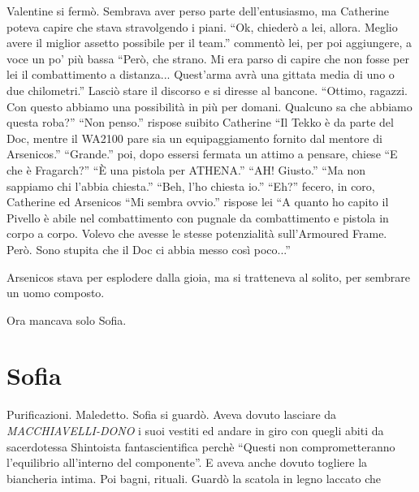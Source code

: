     Valentine si fermò. Sembrava aver perso parte dell'entusiasmo, ma Catherine poteva capire che stava stravolgendo i
    piani. ``Ok, chiederò a lei, allora. Meglio avere il miglior assetto possibile per il team.'' commentò lei, per poi
    aggiungere, a voce un po' più bassa ``Però, che strano. Mi era parso di capire che non fosse per lei il
    combattimento a distanza... Quest'arma avrà una gittata media di uno o due chilometri.'' Lasciò stare il discorso e
    si diresse al bancone. ``Ottimo, ragazzi. Con questo abbiamo una possibilità in più per domani. Qualcuno sa che
    abbiamo questa roba?'' ``Non penso.'' rispose suibito Catherine ``Il Tekko è da parte del Doc, mentre il WA2100 pare
    sia un equipaggiamento fornito dal mentore di Arsenicos.'' ``Grande.'' poi, dopo essersi fermata un attimo a
    pensare, chiese ``E che è Fragarch?'' ``È una pistola per ATHENA.'' ``AH! Giusto.'' ``Ma non sappiamo chi l'abbia
    chiesta.'' ``Beh, l'ho chiesta io.'' ``Eh?'' fecero, in coro, Catherine ed Arsenicos ``Mi sembra ovvio.'' rispose
    lei ``A quanto ho capito il Pivello è abile nel combattimento con pugnale da combattimento e pistola in corpo a
    corpo. Volevo che avesse le stesse potenzialità sull'Armoured Frame. Però. Sono stupita che il Doc ci abbia messo
    così poco...''

    Arsenicos stava per esplodere dalla gioia, ma si tratteneva al solito, per sembrare un uomo composto.

    Ora mancava solo Sofia.

  \section*{Sofia}

    Purificazioni. Maledetto. Sofia si guardò. Aveva dovuto lasciare da \emph{MACCHIAVELLI-DONO} i suoi vestiti ed
    andare in giro con quegli abiti da sacerdotessa Shintoista fantascientifica perchè ``Questi non comprometteranno
    l'equilibrio all'interno del componente''. E aveva anche dovuto togliere la biancheria intima. Poi bagni, rituali.
    Guardò la scatola in legno laccato che 
